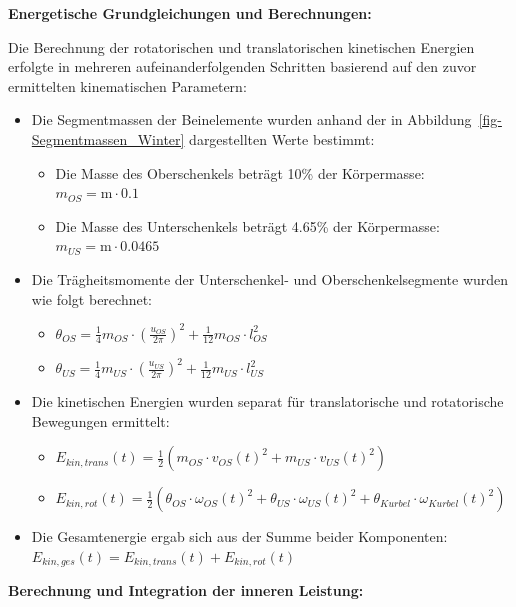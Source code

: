 \documentclass[
  letterpaper,
  DIV=11]{scrartcl}
\providecommand{\tightlist}{%
  \setlength{\itemsep}{0pt}\setlength{\parskip}{0pt}}\usepackage{longtable,booktabs,array}
\begin{document}
\textbf{Energetische Grundgleichungen und Berechnungen:}

Die Berechnung der rotatorischen und translatorischen kinetischen
Energien erfolgte in mehreren aufeinanderfolgenden Schritten basierend
auf den zuvor ermittelten kinematischen Parametern:

\begin{itemize}
\item
  Die Segmentmassen der Beinelemente wurden anhand der in
  Abbildung~\ref{fig-Segmentmassen_Winter} dargestellten Werte bestimmt:

  \begin{itemize}
  \tightlist
  \item
    Die Masse des Oberschenkels beträgt 10\% der Körpermasse:
    \(m_{OS} = \text{m} \cdot 0.1\)
  \item
    Die Masse des Unterschenkels beträgt 4.65\% der Körpermasse:
    \(m_{US} = \text{m} \cdot 0.0465\)
  \end{itemize}
\item
  Die Trägheitsmomente der Unterschenkel- und Oberschenkelsegmente
  wurden wie folgt berechnet:

  \begin{itemize}
  \tightlist
  \item
    \(\theta_{OS} = \frac{1}{4}m_{OS}\cdot(\frac{u_{OS}}{2\pi})^2 + \frac{1}{12}m_{OS}\cdot l_{OS}^2\)
  \item
    \(\theta_{US} = \frac{1}{4}m_{US}\cdot(\frac{u_{US}}{2\pi})^2 + \frac{1}{12}m_{US}\cdot l_{US}^2\)
  \end{itemize}
\item
  Die kinetischen Energien wurden separat für translatorische und
  rotatorische Bewegungen ermittelt:

  \begin{itemize}
  \tightlist
  \item
    \(E_{kin,trans}(t) = \frac{1}{2}(m_{OS} \cdot v_{OS}(t)^2 + m_{US} \cdot v_{US}(t)^2)\)
  \item
    \(E_{kin,rot}(t) = \frac{1}{2}(\theta_{OS} \cdot \omega_{OS}(t)^2 + \theta_{US} \cdot \omega_{US}(t)^2 + \theta_{Kurbel} \cdot \omega_{Kurbel}(t)^2)\)
  \end{itemize}
\item
  Die Gesamtenergie ergab sich aus der Summe beider Komponenten:
  \(E_{kin,ges}(t) = E_{kin,trans}(t) + E_{kin,rot}(t)\)
\end{itemize}

\textbf{Berechnung und Integration der inneren Leistung:}
\end{document}

